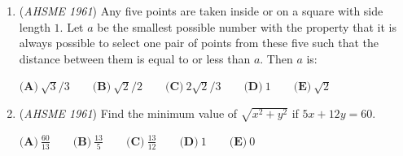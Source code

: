 \begin{enumerate}
 $\textbf{(A)}\ s^2\le8r^2\qquad \textbf{(B)}\ s^2=8r^2 \qquad \textbf{(C)}\ s^2 \ge 8r^2 \qquad\\ \textbf{(D)}\ s^2\le4r^2 \qquad \textbf{(E)}\ s^2=4r^2$


	\item (\textit{AHSME 1961}) Any five points are taken inside or on a square with side length $1$. Let $a$ be the smallest possible number with the 
property that it is always possible to select one pair of points from these five such that the distance between them 
is equal to or less than $a$. Then $a$ is:


 $\textbf{(A)}\ \sqrt{3}/3\qquad \textbf{(B)}\ \sqrt{2}/2\qquad \textbf{(C)}\ 2\sqrt{2}/3\qquad \textbf{(D)}\ 1 \qquad \textbf{(E)}\ \sqrt{2}$


	\item (\textit{AHSME 1961}) Find the minimum value of $\sqrt{x^2+y^2}$ if $5x+12y=60$. 


 $\textbf{(A)}\ \frac{60}{13}\qquad \textbf{(B)}\ \frac{13}{5}\qquad \textbf{(C)}\ \frac{13}{12}\qquad \textbf{(D)}\ 1\qquad \textbf{(E)}\ 0$


\end{enumerate}